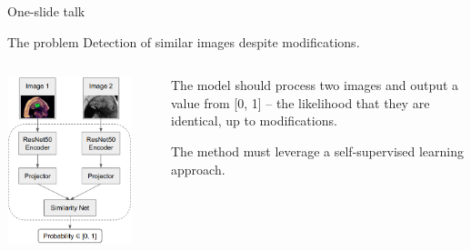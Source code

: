 \documentclass{beamer}
\begin{document}
\begin{frame}{One-slide talk}
\begin{block}{The problem}
Detection of similar images despite modifications.
\end{block}

\medskip

\begin{columns}
    \begin{column}{0.42\textwidth}
        \includegraphics[width=0.86\textwidth]{fig/model.png}
    \end{column}
    \begin{column}{0.58\textwidth}
        The model should process two images and output a value from [0, 1] --
        the likelihood that they are identical, up to modifications.
        
        \bigskip
        The method must leverage a self-supervised learning approach.
    \end{column}
\end{columns}
\end{frame}

\end{document}
